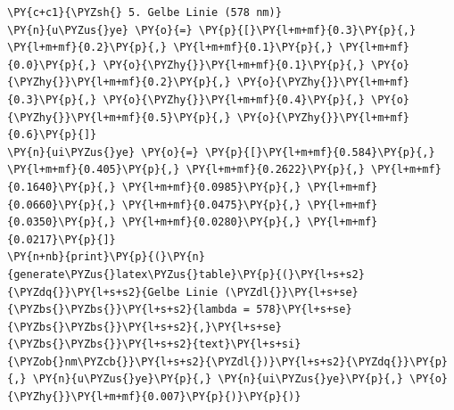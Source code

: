 \begin{tcolorbox}[breakable, size=fbox, boxrule=1pt, pad at break*=1mm,colback=cellbackground, colframe=cellborder]
\begin{Verbatim}[commandchars=\\\{\}]
\PY{c+c1}{\PYZsh{} 5. Gelbe Linie (578 nm)}
\PY{n}{u\PYZus{}ye} \PY{o}{=} \PY{p}{[}\PY{l+m+mf}{0.3}\PY{p}{,} \PY{l+m+mf}{0.2}\PY{p}{,} \PY{l+m+mf}{0.1}\PY{p}{,} \PY{l+m+mf}{0.0}\PY{p}{,} \PY{o}{\PYZhy{}}\PY{l+m+mf}{0.1}\PY{p}{,} \PY{o}{\PYZhy{}}\PY{l+m+mf}{0.2}\PY{p}{,} \PY{o}{\PYZhy{}}\PY{l+m+mf}{0.3}\PY{p}{,} \PY{o}{\PYZhy{}}\PY{l+m+mf}{0.4}\PY{p}{,} \PY{o}{\PYZhy{}}\PY{l+m+mf}{0.5}\PY{p}{,} \PY{o}{\PYZhy{}}\PY{l+m+mf}{0.6}\PY{p}{]}
\PY{n}{ui\PYZus{}ye} \PY{o}{=} \PY{p}{[}\PY{l+m+mf}{0.584}\PY{p}{,} \PY{l+m+mf}{0.405}\PY{p}{,} \PY{l+m+mf}{0.2622}\PY{p}{,} \PY{l+m+mf}{0.1640}\PY{p}{,} \PY{l+m+mf}{0.0985}\PY{p}{,} \PY{l+m+mf}{0.0660}\PY{p}{,} \PY{l+m+mf}{0.0475}\PY{p}{,} \PY{l+m+mf}{0.0350}\PY{p}{,} \PY{l+m+mf}{0.0280}\PY{p}{,} \PY{l+m+mf}{0.0217}\PY{p}{]}
\PY{n+nb}{print}\PY{p}{(}\PY{n}{generate\PYZus{}latex\PYZus{}table}\PY{p}{(}\PY{l+s+s2}{\PYZdq{}}\PY{l+s+s2}{Gelbe Linie (\PYZdl{}}\PY{l+s+se}{\PYZbs{}\PYZbs{}}\PY{l+s+s2}{lambda = 578}\PY{l+s+se}{\PYZbs{}\PYZbs{}}\PY{l+s+s2}{,}\PY{l+s+se}{\PYZbs{}\PYZbs{}}\PY{l+s+s2}{text}\PY{l+s+si}{\PYZob{}nm\PYZcb{}}\PY{l+s+s2}{\PYZdl{})}\PY{l+s+s2}{\PYZdq{}}\PY{p}{,} \PY{n}{u\PYZus{}ye}\PY{p}{,} \PY{n}{ui\PYZus{}ye}\PY{p}{,} \PY{o}{\PYZhy{}}\PY{l+m+mf}{0.007}\PY{p}{)}\PY{p}{)}
\end{Verbatim}
\end{tcolorbox}

